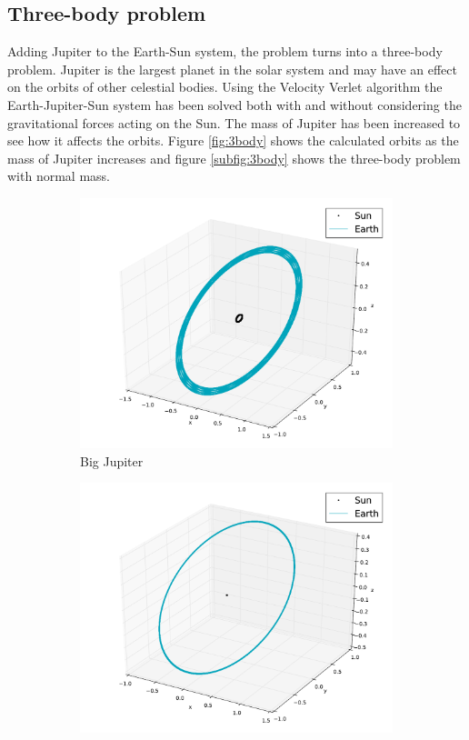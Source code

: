 \documentclass{article}
\begin{document}
\subsection{Three-body problem}
Adding Jupiter to the Earth-Sun system, the problem turns into a three-body problem. Jupiter is the largest planet in the solar system and may have an effect on the orbits of other celestial bodies. Using the Velocity Verlet algorithm the Earth-Jupiter-Sun system has been solved both with and without considering the gravitational forces acting on the Sun. The mass of Jupiter has been increased to see how it affects the orbits. Figure \ref{fig:3body} shows the calculated orbits as the mass of Jupiter increases and figure \ref{subfig:3body} shows the three-body problem with normal mass. 
\begin{figure}
\begin{subfigure}[b]{0.5\textwidth}
\centering
\includegraphics[width=1\linewidth]{fig/Three_Bodies_Big_Jupiter_Earth.pdf}
\caption{Big Jupiter}
\label{subfig:3body_big}
\end{subfigure}
\begin{subfigure}[b]{0.5\textwidth}
\centering
\includegraphics[width=1\linewidth]{fig/Three_Bodies_Big_Jupiter_Fixed_Earth.pdf}

\end{subfigure}
\end{figure}
\end{document}
